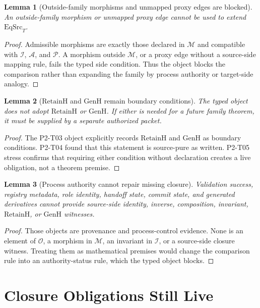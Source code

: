 \documentclass[11pt]{article}
\newcommand{\EqSrcT}{\mathrm{EqSrc}_{T}}
\newcommand{\RetainH}{\mathrm{RetainH}}
\newcommand{\GenH}{\mathrm{GenH}}
\newcommand{\Osrc}{\mathcal{O}}
\newcommand{\Msrc}{\mathcal{M}}
\newcommand{\Isrc}{\mathcal{I}}
\newcommand{\Asrc}{\mathcal{A}}
\newcommand{\Psrc}{\mathcal{P}}
\newtheorem{lemma}{Lemma}
\begin{document}
\begin{lemma}[Outside-family morphisms and unmapped proxy edges are blocked]
An outside-family morphism or unmapped proxy edge cannot be used to extend
\(\EqSrcT\).
\end{lemma}

\begin{proof}
Admissible morphisms are exactly those declared in \(\Msrc\) and compatible
with \(\Isrc\), \(\Asrc\), and \(\Psrc\). A morphism outside \(\Msrc\), or a
proxy edge without a source-side mapping rule, fails the typed side condition.
Thus the object blocks the comparison rather than expanding the family by
process authority or target-side analogy.
\end{proof}

\begin{lemma}[\(\RetainH\) and \(\GenH\) remain boundary conditions]
The typed object does not adopt \(\RetainH\) or \(\GenH\). If either is needed
for a future family theorem, it must be supplied by a separate authorized
packet.
\end{lemma}

\begin{proof}
The P2-T03 object explicitly records \(\RetainH\) and \(\GenH\) as boundary
conditions. P2-T04 found that this statement is source-pure as written. P2-T05
stress confirms that requiring either condition without declaration creates a
live obligation, not a theorem premise.
\end{proof}

\begin{lemma}[Process authority cannot repair missing closure]
Validation success, registry metadata, role identity, handoff state, commit
state, and generated derivatives cannot provide source-side identity, inverse,
composition, invariant, \(\RetainH\), or \(\GenH\) witnesses.
\end{lemma}

\begin{proof}
Those objects are provenance and process-control evidence. None is an element
of \(\Osrc\), a morphism in \(\Msrc\), an invariant in \(\Isrc\), or a
source-side closure witness. Treating them as mathematical premises would
change the comparison rule into an authority-status rule, which the typed
object blocks.
\end{proof}

\section{Closure Obligations Still Live}
\end{document}
